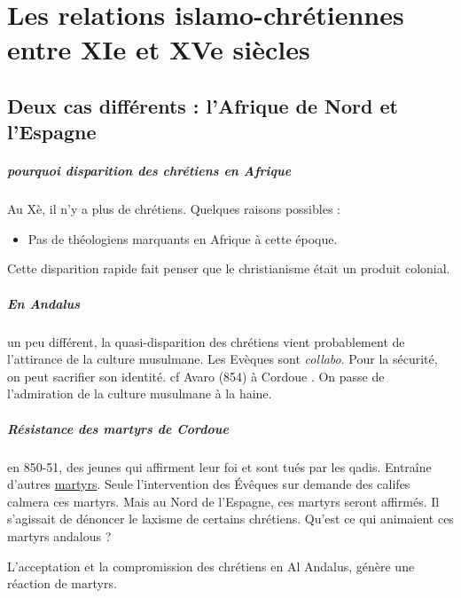 \chapter{Les relations islamo-chrétiennes entre XIe et XVe siècles}

\section{Deux cas différents : l'Afrique de Nord et l'Espagne}


\paragraph{pourquoi disparition des chrétiens en Afrique}
Au Xè, il n'y a plus de chrétiens. 
Quelques raisons possibles : 
\begin{itemize}
    \item Pas de théologiens marquants en Afrique à cette époque.
\end{itemize}
Cette disparition rapide fait penser que le christianisme était un produit colonial. 


\paragraph{En Andalus} un peu différent, la quasi-disparition des chrétiens vient probablement de l'attirance de la culture musulmane. 
Les Evèques sont \textit{collabo}. Pour la sécurité, on peut sacrifier son identité. 
cf Avaro (854) à Cordoue . On passe de l'admiration de la culture musulmane à la haine.


\paragraph{Résistance des martyrs de Cordoue} en 850-51, des jeunes qui affirment leur foi et sont tués par les qadis. Entraîne d'autres \href{https://fr.wikipedia.org/wiki/Martyrs_de_Cordoue}{martyrs}. Seule l'intervention des Évêques sur demande des califes calmera ces martyrs. Mais au Nord de l'Espagne, ces martyrs seront affirmés.
Il s'agissait de dénoncer le laxisme de certains chrétiens. Qu'est ce qui animaient ces martyrs andalous ? 

\begin{Synthesis}
    L'acceptation et la compromission des chrétiens en Al Andalus, génère une réaction de martyrs. 
\end{Synthesis}

